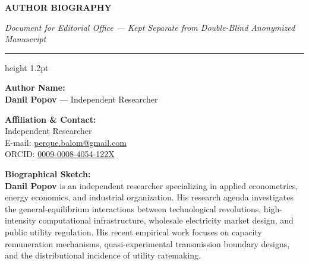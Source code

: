 \documentclass[11pt]{article}
\begin{document}
\begin{center}
    {\large \textbf{AUTHOR BIOGRAPHY}}\par
    {\footnotesize \textit{Document for Editorial Office --- Kept Separate from Double-Blind Anonymized Manuscript}}\par
    \vspace{0.4cm}
    \hrule height 1.2pt
\end{center}
\vspace{0.5cm}

\noindent \textbf{Author Name:} \\
\textbf{Danil Popov} --- Independent Researcher \\
\vspace{0.4cm}

\noindent \textbf{Affiliation \& Contact:} \\
Independent Researcher \\
E-mail: \href{mailto:perque.balom@gmail.com}{perque.balom@gmail.com} \\
ORCID: \href{https://orcid.org/0009-0008-4054-122X}{0009-0008-4054-122X} \\
\vspace{0.4cm}

\noindent \textbf{Biographical Sketch:} \\
\textbf{Danil Popov} is an independent researcher specializing in applied econometrics, energy economics, and industrial organization. His research agenda investigates the general-equilibrium interactions between technological revolutions, high-intensity computational infrastructure, wholesale electricity market design, and public utility regulation. His recent empirical work focuses on capacity remuneration mechanisms, quasi-experimental transmission boundary designs, and the distributional incidence of utility ratemaking.
\end{document}
